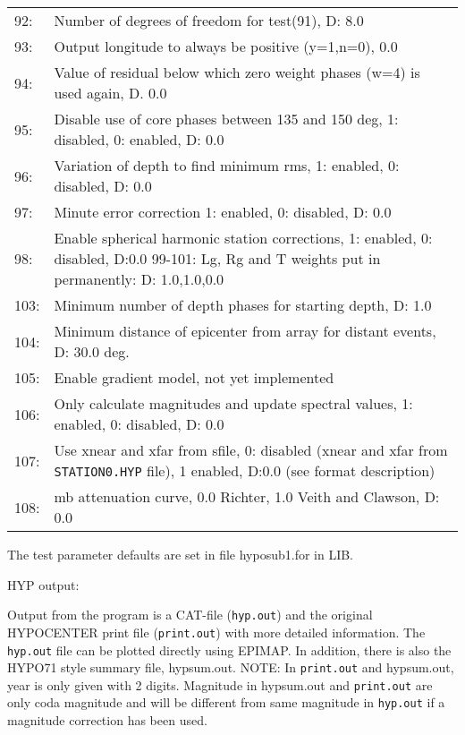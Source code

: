 \begin{longtable}{lp{14.5cm}}
92: &  	Number of degrees of freedom for test(91), D: 8.0 \\
93: &  	Output longitude to always be positive (y=1,n=0), 0.0 \\
94: &  	Value of residual below which zero weight phases (w=4) is used again, D. 0.0 \\
95: &  	Disable use of core phases between 135 and 150 deg, 1: disabled, 0: enabled, D: 0.0 \\
96: &  	Variation of depth to find minimum rms, 1: enabled, 0: disabled, D: 0.0 \\
97: &  	Minute error correction 1: enabled, 0: disabled, D: 0.0 \\
98:  & Enable spherical harmonic station corrections, 1: enabled, 0: disabled, D:0.0 99-101: Lg, Rg and T weights put in permanently: D: 1.0,1.0,0.0 \\
103: &  	Minimum number of depth phases for starting depth, D: 1.0 \\
104: &  	Minimum distance of epicenter from array for distant events, D: 30.0 deg. \\
105: &  	Enable gradient model, not yet implemented \\
106: &  	Only calculate magnitudes and update spectral values, 1: enabled, 0: disabled, D: 0.0 \\
107: &  	Use xnear and xfar from sfile, 0: disabled (xnear and xfar 
from \texttt{STATION0.HYP} file), 1 enabled,  D:0.0 (see format description) \\
108: &  	mb attenuation curve, 0.0 Richter, 1.0 Veith and Clawson, D: 0.0 \\
\end{longtable}

The test parameter defaults are set in file hyposub1.for in LIB. 

HYP output: 

Output from the program is a CAT-file (\texttt{hyp.out}) and the original HYPOCENTER print file (\texttt{print.out}) with more detailed information. The \texttt{hyp.out} file can be plotted directly using EPIMAP. In addition, there is also the HYPO71 style summary file, hypsum.out. NOTE: In \texttt{print.out} and hypsum.out, year is only given with 2 digits. Magnitude in hypsum.out and \texttt{print.out} are only coda magnitude and will be different from same magnitude in \texttt{hyp.out} if a magnitude correction has been used.

